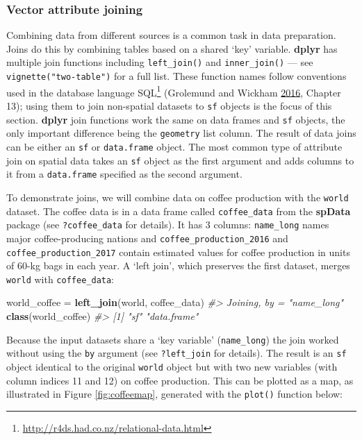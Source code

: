 \documentclass[]{krantz}
\newenvironment{Shaded}{\begin{snugshade}}{\end{snugshade}}
\newcommand{\CommentTok}[1]{\textcolor[rgb]{0.37,0.37,0.37}{\textit{#1}}}
\newcommand{\KeywordTok}[1]{\textcolor[rgb]{0.27,0.27,0.27}{\textbf{#1}}}
\newcommand{\NormalTok}[1]{#1}
\newcommand{\StringTok}[1]{\textcolor[rgb]{0.5,0.5,0.5}{#1}}
\let\rmarkdownfootnote\footnote%
\def\footnote{\protect\rmarkdownfootnote}
\renewcommand{\href}[2]{#2\footnote{\url{#1}}}
\begin{document}
\hypertarget{vector-attribute-joining}{%
\subsubsection{Vector attribute joining}\label{vector-attribute-joining}}

Combining data from different sources is a common task in data preparation.
Joins do this by combining tables based on a shared `key' variable.
\textbf{dplyr} has multiple join functions including \texttt{left\_join()} and \texttt{inner\_join()} --- see \texttt{vignette("two-table")} for a full list.
These function names follow conventions used in the database language \href{http://r4ds.had.co.nz/relational-data.html}{SQL} (Grolemund and Wickham \protect\hyperlink{ref-grolemund_r_2016}{2016}, Chapter 13); using them to join non-spatial datasets to \texttt{sf} objects is the focus of this section.
\textbf{dplyr} join functions work the same on data frames and \texttt{sf} objects, the only important difference being the \texttt{geometry} list column.
The result of data joins can be either an \texttt{sf} or \texttt{data.frame} object.
The most common type of attribute join on spatial data takes an \texttt{sf} object as the first argument and adds columns to it from a \texttt{data.frame} specified as the second argument.

To demonstrate joins, we will combine data on coffee production with the \texttt{world} dataset.
The coffee data is in a data frame called \texttt{coffee\_data} from the \textbf{spData} package (see \texttt{?coffee\_data} for details).
It has 3 columns:
\texttt{name\_long} names major coffee-producing nations and \texttt{coffee\_production\_2016} and \texttt{coffee\_production\_2017} contain estimated values for coffee production in units of 60-kg bags in each year.
A `left join', which preserves the first dataset, merges \texttt{world} with \texttt{coffee\_data}:

\begin{Shaded}
\begin{Highlighting}[]
\NormalTok{world_coffee =}\StringTok{ }\KeywordTok{left_join}\NormalTok{(world, coffee_data)}
\CommentTok{#> Joining, by = "name_long"}
\KeywordTok{class}\NormalTok{(world_coffee)}
\CommentTok{#> [1] "sf"         "data.frame"}
\end{Highlighting}
\end{Shaded}

Because the input datasets share a `key variable' (\texttt{name\_long}) the join worked without using the \texttt{by} argument (see \texttt{?left\_join} for details).
The result is an \texttt{sf} object identical to the original \texttt{world} object but with two new variables (with column indices 11 and 12) on coffee production.
This can be plotted as a map, as illustrated in Figure \ref{fig:coffeemap}, generated with the \texttt{plot()} function below:
\end{document}
